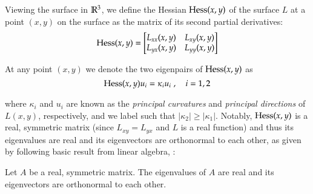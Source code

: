   Viewing the surface in $\mathbb{R}^3$, we define the Hessian  $\mathrm{Hess}(x,y)$ of the surface $L$
  at a point $(x,y)$ on the surface as the matrix of its second partial derivatives:
  \begin{equation}
  \mathrm{Hess}(x,y) = \begin{bmatrix}
  L_{xx}(x,y) & L_{xy}(x,y) \\
  L_{yx}(x,y) & L_{yy}(x,y)
  \end{bmatrix}
  \end{equation}
  
  At any point $(x,y)$ we denote the two eigenpairs of $\mathrm{Hess}(x,y)$ as
  \begin{equation}
  \mathrm{Hess}(x,y) u_i = \kappa_i u_i \; , \quad i = 1,2
  \end{equation}
  
  where $\kappa_i$ and $u_i$ are known as the
  \textit{principal curvatures} and \textit{principal directions}  of $L(x,y)$, respectively, and we label such that $|\kappa_2| \ge |\kappa_1|$. Notably, $\mathrm{Hess}(x,y)$ is a real, symmetric matrix (since  $L_{xy} = L_{yx}$ and $L$ is a real function) and thus its eigenvalues are real and its eigenvectors are orthonormal to each other, as given by following basic result from linear algebra,
  \cite{burden-faires}:
  
  \begin{lemma}
     	Let $A$ be a real, symmetric matrix. The eigenvalues of $A$ are real and its eigenvectors are orthonormal to each other.
  \end{lemma}
  
